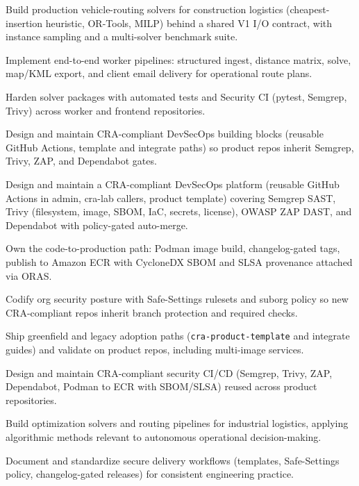 
\begin{cvitems}
    {
    \item Build production vehicle-routing solvers for construction logistics (cheapest-insertion heuristic, OR-Tools, MILP) behind a shared V1 I/O contract, with instance sampling and a multi-solver benchmark suite.
    \item Implement end-to-end worker pipelines: structured ingest, distance matrix, solve, map/KML export, and client email delivery for operational route plans.
    \item Harden solver packages with automated tests and Security CI (pytest, Semgrep, Trivy) across worker and frontend repositories.
    \item Design and maintain CRA-compliant DevSecOps building blocks (reusable GitHub Actions, template and integrate paths) so product repos inherit Semgrep, Trivy, ZAP, and Dependabot gates.
    }
    {}
    {
    \item Design and maintain a CRA-compliant DevSecOps platform (reusable GitHub Actions in admin, cra-lab callers, product template) covering Semgrep SAST, Trivy (filesystem, image, SBOM, IaC, secrets, license), OWASP ZAP DAST, and Dependabot with policy-gated auto-merge.
    \item Own the code-to-production path: Podman image build, changelog-gated tags, publish to Amazon ECR with CycloneDX SBOM and SLSA provenance attached via ORAS.
    \item Codify org security posture with Safe-Settings rulesets and suborg policy so new CRA-compliant repos inherit branch protection and required checks.
    \item Ship greenfield and legacy adoption paths (\texttt{cra-product-template} and integrate guides) and validate on product repos, including multi-image services.
    }
    {}
    {
    \item Design and maintain CRA-compliant security CI/CD (Semgrep, Trivy, ZAP, Dependabot, Podman to ECR with SBOM/SLSA) reused across product repositories.
    \item Build optimization solvers and routing pipelines for industrial logistics, applying algorithmic methods relevant to autonomous operational decision-making.
    \item Document and standardize secure delivery workflows (templates, Safe-Settings policy, changelog-gated releases) for consistent engineering practice.
    }
    {}
\end{cvitems}

